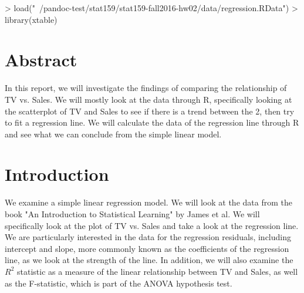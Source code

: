 \documentclass{article}
\begin{document}


\begin{Schunk}
\begin{Sinput}
> load("~/pandoc-test/stat159/stat159-fall2016-hw02/data/regression.RData")
> library(xtable)
\end{Sinput}
\end{Schunk}



\section{Abstract}

  In this report, we will investigate the findings of comparing the relationship of TV vs. Sales.  We will mostly look at the data through R, specifically looking at the scatterplot of TV and Sales to see if there is a trend between the 2, then try to fit a regression line. We will calculate the data of the regression line through R and see what we can conclude from the simple linear model.


\section{Introduction}

  We examine a simple linear regression model.  We will look at the data from the book "An Introduction to Statistical Learning" by James et al.  We will specifically look at the plot of TV vs. Sales and take a look at the regression line.  We are particularly interested in the data for the regression residuals, including intercept and slope, more commonly known as the coefficients of the regression line, as we look at the strength of the line.  In addition, we will also examine the $R^2$ statistic as a measure of the linear relationship between TV and Sales, as well as the F-statistic, which is part of the ANOVA hypothesis test.
\end{document}
